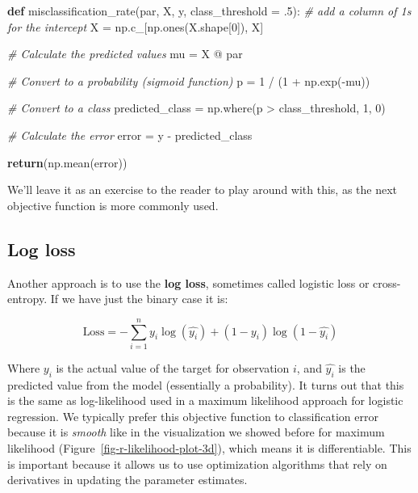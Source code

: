 \documentclass[
  letterpaper,
]{krantz}
\newenvironment{Shaded}{}{}
\newcommand{\CommentTok}[1]{\textcolor[rgb]{0.38,0.63,0.69}{\textit{#1}}}
\newcommand{\ControlFlowTok}[1]{\textcolor[rgb]{0.00,0.44,0.13}{\textbf{#1}}}
\newcommand{\DecValTok}[1]{\textcolor[rgb]{0.25,0.63,0.44}{#1}}
\newcommand{\FloatTok}[1]{\textcolor[rgb]{0.25,0.63,0.44}{#1}}
\newcommand{\KeywordTok}[1]{\textcolor[rgb]{0.00,0.44,0.13}{\textbf{#1}}}
\newcommand{\NormalTok}[1]{#1}
\newcommand{\OperatorTok}[1]{\textcolor[rgb]{0.40,0.40,0.40}{#1}}
\begin{document}
\begin{Shaded}
\begin{Highlighting}[]
\KeywordTok{def}\NormalTok{ misclassification\_rate(par, X, y, class\_threshold }\OperatorTok{=} \FloatTok{.5}\NormalTok{):}
    \CommentTok{\# add a column of 1s for the intercept}
\NormalTok{    X }\OperatorTok{=}\NormalTok{ np.c\_[np.ones(X.shape[}\DecValTok{0}\NormalTok{]), X]}

    \CommentTok{\# Calculate the predicted values}
\NormalTok{    mu }\OperatorTok{=}\NormalTok{ X }\OperatorTok{@}\NormalTok{ par}
    
    \CommentTok{\# Convert to a probability (\textquotesingle{}sigmoid\textquotesingle{} function)}
\NormalTok{    p }\OperatorTok{=} \DecValTok{1} \OperatorTok{/}\NormalTok{ (}\DecValTok{1} \OperatorTok{+}\NormalTok{ np.exp(}\OperatorTok{{-}}\NormalTok{mu))}
    
    \CommentTok{\# Convert to a class}
\NormalTok{    predicted\_class }\OperatorTok{=}\NormalTok{ np.where(p }\OperatorTok{\textgreater{}}\NormalTok{ class\_threshold, }\DecValTok{1}\NormalTok{, }\DecValTok{0}\NormalTok{)}
    
    \CommentTok{\# Calculate the error}
\NormalTok{    error }\OperatorTok{=}\NormalTok{ y }\OperatorTok{{-}}\NormalTok{ predicted\_class }
    
    \ControlFlowTok{return}\NormalTok{(np.mean(error))}
\end{Highlighting}
\end{Shaded}

We'll leave it as an exercise to the reader to play around with this, as
the next objective function is more commonly used.

\subsection{Log loss}\label{log-loss}

Another approach is to use the \textbf{log loss}, sometimes called
logistic loss or cross-entropy. If we have just the binary case it is:

\[
\textrm{Loss} = -\sum_{i=1}^{n} y_i \log(\hat{y_i}) + (1 - y_i) \log(1 - \hat{y_i})
\]

Where \(y_i\) is the actual value of the target for observation \(i\),
and \(\hat{y_i}\) is the predicted value from the model (essentially a
probability). It turns out that this is the same as log-likelihood used
in a maximum likelihood approach for logistic regression. We typically
prefer this objective function to classification error because it is
\emph{smooth} like in the visualization we showed before for maximum
likelihood (Figure~\ref{fig-r-likelihood-plot-3d}), which means it is
differentiable. This is important because it allows us to use
optimization algorithms that rely on derivatives in updating the
parameter estimates.
\end{document}

